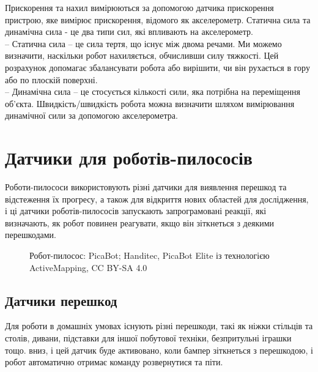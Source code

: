 \documentclass[a4paper,14pt]{extreport}
\begin{document}
Прискорення та нахил вимірюються за допомогою датчика прискорення пристрою, яке вимірює прискорення, відомого як акселерометр. Статична сила та динамічна сила - це два типи сил, які впливають на акселерометр.\\

-- Статична сила -- це сила тертя, що існує між двома речами. Ми можемо визначити, наскільки робот нахиляється, обчисливши силу тяжкості. Цей розрахунок допомагає збалансувати робота або вирішити, чи він рухається в гору або по плоскій поверхні.\\ 

-- Динамічна сила --  це стосується кількості сили, яка потрібна на переміщення об'єкта. Швидкість/швидкість робота можна визначити шляхом вимірювання динамічної сили за допомогою акселерометра.

\section{Датчики для роботів-пилососів}\par

Роботи-пилососи використовують різні датчики для виявлення перешкод та відстеження їх прогресу, а також для відкриття нових областей для дослідження, і ці датчики роботів-пилососів запускають запрограмовані реакції, які визначають, як робот повинен реагувати, якщо він зіткнеться з деякими перешкодами.


\begin{figure}[h!]
   \caption{Робот-пилосос: PicaBot; Handitec, PicaBot Elite із технологією ActiveMapping, CC BY-SA 4.0}
 \end{figure}

 \subsection{Датчики перешкод}
Для роботи в домашніх умовах існують різні перешкоди, такі як ніжки стільців та столів, дивани, підставки для іншої побутової техніки, безпритульні іграшки тощо. вниз, і цей датчик буде активовано, коли бампер зіткнеться з перешкодою, і робот автоматично отримає команду розвернутися та піти.
\end{document}
